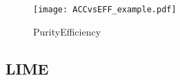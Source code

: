 \begin{figure}
\begin{center}
\texttt{[image: ACCvsEFF\_example.pdf]}

\end{center}
\caption{PurityEfficiency}
\label{fig:PURvsEFF}
\end{figure}

\subsection{LIME}





















